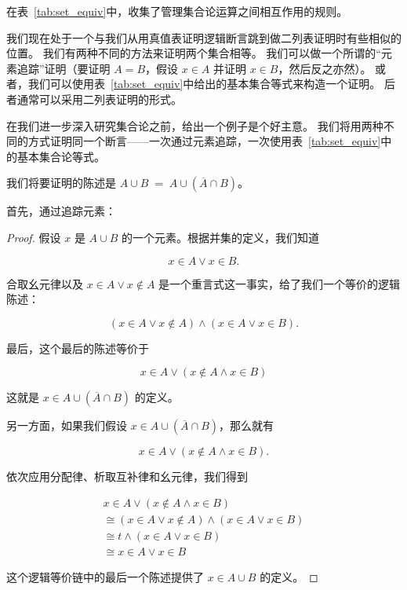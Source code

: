 在表~\ref{tab:set_equiv}中，收集了管理集合论运算之间相互作用的规则。

我们现在处于一个与我们从用真值表证明逻辑断言跳到做二列表证明时有些相似的位置。
我们有两种不同的方法来证明两个集合相等。
我们可以做一个所谓的“元素追踪”证明（要证明 $A=B$，假设 $x \in A$ 并证明 $x \in B$，然后反之亦然）。
或者，我们可以使用表~\ref{tab:set_equiv}中给出的基本集合等式来构造一个证明。
后者通常可以采用二列表证明的形式。

\begin{table}[h] 
\begin{center}

\end{center}
\caption{基本集合论等式。}
\label{tab:set_equiv}
\end{table}

\clearpage

在我们进一步深入研究集合论之前，给出一个例子是个好主意。
我们将用两种不同的方式证明同一个断言——一次通过元素追踪，一次使用表~\ref{tab:set_equiv}中的基本集合论等式。

我们将要证明的陈述是 $A \cup B \; = \; A \cup (\overline{A} \cap B)$。

首先，通过追踪元素：

\begin{proof}
假设 $x$ 是 $A \cup B$ 的一个元素。根据并集的定义，我们知道

\[ x \in A \lor x \in B. \]

合取幺元律以及 $x \in A \lor x \notin A$ 是一个重言式这一事实，给了我们一个等价的逻辑陈述：

\[ (x \in A \lor x \notin A) \land (x \in A \lor x \in B).
\]

最后，这个最后的陈述等价于

\[ x \in A \lor (x \notin A \land x \in B) \]

\noindent 这就是 $x \in A \cup (\overline{A} \cap B)$ 的定义。

另一方面，如果我们假设 $x \in A \cup (\overline{A} \cap B)$，那么就有

\[ x \in A \lor (x \notin A \land x \in B).
\]

依次应用分配律、析取互补律和幺元律，我们得到

\begin{gather*} 
 x \in A \lor (x \notin A \land x \in B) \\
\cong (x \in A \lor x \notin A) \land (x \in A \lor x \in B) \\
\cong t \land (x \in A \lor x \in B) \\
\cong x \in A \lor x \in B
\end{gather*}

这个逻辑等价链中的最后一个陈述提供了 $x \in A \cup B$ 的定义。
\end{proof}


